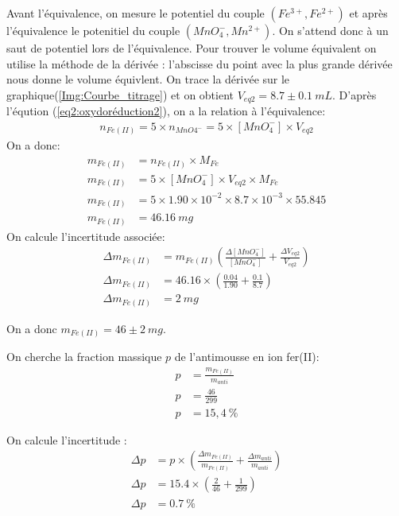 \documentclass[12pt]{article}
\begin{document}
Avant l'équivalence, on mesure le potentiel du couple $(Fe^{3+},Fe^{2+})$ et après l'équivalence le potenitiel du couple $(MnO_4^-,Mn^{2+})$.
On s'attend donc à un saut de potentiel lors de l'équivalence.
Pour trouver le volume équivalent on utilise la méthode de la dérivée : l'abscisse du point avec la plus grande dérivée nous donne le volume équivlent.
On trace la dérivée sur le graphique(\ref{Img:Courbe_titrage}) et on obtient $V_{eq2}=8.7\pm 0.1 \ mL$.
D'après l'éqution (\ref{eq2:oxydoréduction2}), on a la relation à l'équivalence:
\begin{align*}
    n_{Fe(II)}=5\times n_{MnO4^-}=5 \times [MnO_4^-] \times V_{eq2}
\end{align*}
On a donc:
\begin{align*}
    m_{Fe(II)}&=n_{Fe(II)} \times M_{Fe} \\
    m_{Fe(II)}&=5 \times [MnO_4^-] \times V_{eq2} \times M_{Fe} \\
    m_{Fe(II)}&=5 \times 1.90 \times 10^{-2} \times 8.7 \times 10^{-3} \times 55.845 \\
    m_{Fe(II)}&=46.16 \ mg
\end{align*}
On calcule l'incertitude associée:
\begin{align*}
    \Delta  m_{Fe(II)} &=  m_{Fe(II)} \left( \frac{\Delta [MnO_4^-]}{[MnO_4^-]} + \frac{\Delta V_{eq2}}{V_{eq2}} \right) \\
    \Delta  m_{Fe(II)} &= 46.16 \times \left( \frac{0.04}{1.90} +\frac{0.1}{8.7} \right) \\
    \Delta  m_{Fe(II)} &= 2 \ mg
\end{align*}

On a donc $m_{Fe(II)}= 46 \pm 2 \ mg$.

On cherche la fraction massique $p$ de l'antimousse en ion fer(II):
\begin{align*}
    p&= \frac{m_{Fe(II)}}{m_{anti}} \\
    p&= \frac{46}{299} \\
    p&= 15,4 \ \%
\end{align*}

On calcule l'incertitude :
\begin{align*}
    \Delta p &= p \times \left( \frac{\Delta m_{Fe(II)}}{m_{Fe(II)}} + \frac{\Delta m_{anti}}{m_{anti}} \right)\\
    \Delta p &= 15.4 \times \left( \frac{2}{46} + \frac{1}{299}\right) \\
    \Delta p &= 0.7 \ \%
\end{align*}
\end{document}
